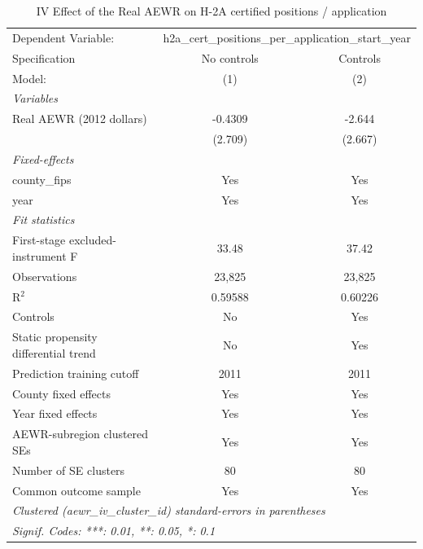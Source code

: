 
\begin{table}[htbp]
   \caption{\label{tab:iv_h2a_positions_per_application} IV Effect of the Real AEWR on H-2A certified positions / application}
   \centering
   \begin{tabular}{lcc}
      \tabularnewline \midrule \midrule
      Dependent Variable: & \multicolumn{2}{c}{h2a\_cert\_positions\_per\_application\_start\_year}\\
      Specification                        & No controls & Controls \\
      Model:                               & (1)         & (2)\\
      \midrule
      \emph{Variables}\\
      Real AEWR (2012 dollars)             & -0.4309     & -2.644\\
                                           & (2.709)     & (2.667)\\
      \midrule
      \emph{Fixed-effects}\\
      county\_fips                         & Yes         & Yes\\
      year                                 & Yes         & Yes\\
      \midrule
      \emph{Fit statistics}\\
      First-stage excluded-instrument F    & 33.48       & 37.42\\
      Observations                         & 23,825      & 23,825\\
      R$^2$                                & 0.59588     & 0.60226\\
      Controls                             & No          & Yes\\
      Static propensity differential trend & No          & Yes\\
      Prediction training cutoff           & 2011        & 2011\\
      County fixed effects                 & Yes         & Yes\\
      Year fixed effects                   & Yes         & Yes\\
      AEWR-subregion clustered SEs         & Yes         & Yes\\
      Number of SE clusters                & 80          & 80\\
      Common outcome sample                & Yes         & Yes\\
      \midrule \midrule
      \multicolumn{3}{l}{\emph{Clustered (aewr\_iv\_cluster\_id) standard-errors in parentheses}}\\
      \multicolumn{3}{l}{\emph{Signif. Codes: ***: 0.01, **: 0.05, *: 0.1}}\\
   \end{tabular}


\end{table}
